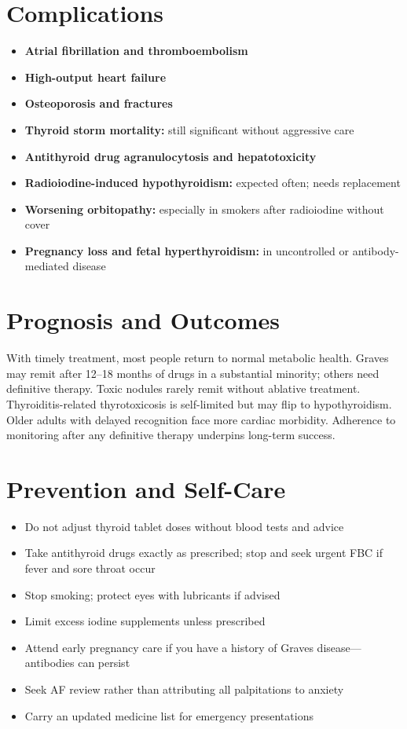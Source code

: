 \section*{Complications}
\begin{itemize}
    \item \textbf{Atrial fibrillation and thromboembolism}
    \item \textbf{High-output heart failure}
    \item \textbf{Osteoporosis and fractures}
    \item \textbf{Thyroid storm mortality:} still significant without aggressive care
    \item \textbf{Antithyroid drug agranulocytosis and hepatotoxicity}
    \item \textbf{Radioiodine-induced hypothyroidism:} expected often; needs replacement
    \item \textbf{Worsening orbitopathy:} especially in smokers after radioiodine without cover
    \item \textbf{Pregnancy loss and fetal hyperthyroidism:} in uncontrolled or antibody-mediated disease
\end{itemize}

\section*{Prognosis and Outcomes}
With timely treatment, most people return to normal metabolic health. Graves may remit after 12--18 months of drugs in a substantial minority; others need definitive therapy. Toxic nodules rarely remit without ablative treatment. Thyroiditis-related thyrotoxicosis is self-limited but may flip to hypothyroidism. Older adults with delayed recognition face more cardiac morbidity. Adherence to monitoring after any definitive therapy underpins long-term success.

\section*{Prevention and Self-Care}
\begin{itemize}
    \item Do not adjust thyroid tablet doses without blood tests and advice
    \item Take antithyroid drugs exactly as prescribed; stop and seek urgent FBC if fever and sore throat occur
    \item Stop smoking; protect eyes with lubricants if advised
    \item Limit excess iodine supplements unless prescribed
    \item Attend early pregnancy care if you have a history of Graves disease---antibodies can persist
    \item Seek AF review rather than attributing all palpitations to anxiety
    \item Carry an updated medicine list for emergency presentations
\end{itemize}

